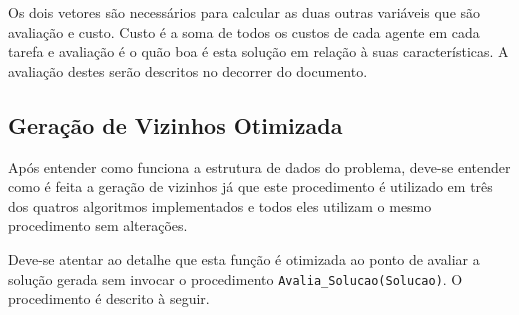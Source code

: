 \documentclass[portugues, brazil, a4paper,12pt]{article}
\begin{document}
		Os dois vetores são necessários para calcular as duas outras variáveis que são avaliação e custo. Custo é a soma de todos os custos de cada agente em cada tarefa e avaliação é o quão boa é esta solução em relação à suas características. A avaliação destes serão descritos no decorrer do documento.


	\subsection{Geração de Vizinhos Otimizada} \label{sec:otimizacao}
		Após entender como funciona a estrutura de dados do problema, deve-se entender como é feita a geração de vizinhos já que este procedimento é utilizado em três dos quatros algoritmos implementados e todos eles utilizam o mesmo procedimento sem alterações.

		Deve-se atentar ao detalhe que esta função é otimizada ao ponto de avaliar a solução gerada sem invocar o procedimento \verb|Avalia_Solucao(Solucao)|. O procedimento é descrito à seguir.
\end{document}
